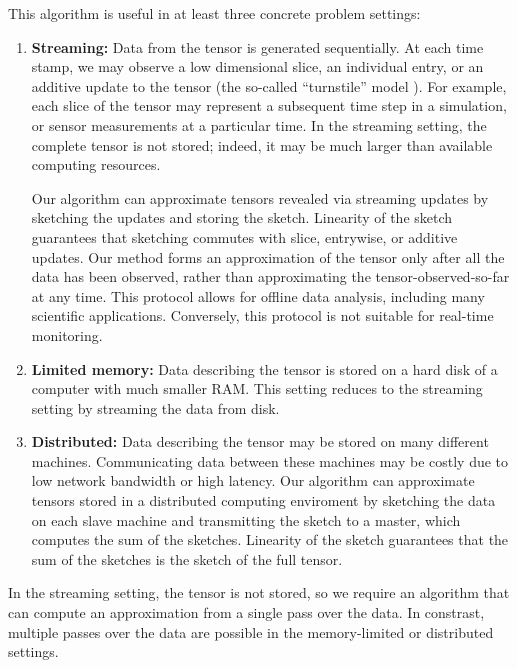 This algorithm is useful in at least three concrete problem settings:
\begin{enumerate}
\item{\bf Streaming:} Data from the tensor is generated sequentially.
At each time stamp, we may observe
a low dimensional slice,
an individual entry,
or an additive update to the tensor
(the so-called ``turnstile'' model \citep{muthukrishnan2005data}).
For example, each slice of the tensor may represent a subsequent
time step in a simulation, or sensor measurements at a particular time.
In the streaming setting,
the complete tensor is not stored; indeed, it may be much larger than
available computing resources.

Our algorithm can approximate tensors revealed via streaming updates
by sketching the updates and storing the sketch.
Linearity of the sketch guarantees that sketching commutes with
slice, entrywise, or additive updates.
Our method forms an approximation of the tensor
only after all the data has been observed,
rather than approximating the tensor-observed-so-far at any time.
This protocol allows for offline data analysis,
including many scientific applications.
Conversely, this protocol is not suitable for real-time monitoring.

\item{\bf Limited memory:} Data describing the tensor is stored on a hard disk
of a computer with much smaller RAM.
This setting reduces to the streaming setting by streaming the data
from disk.
\item {\bf Distributed:} Data describing the tensor may
be stored on many different machines.
Communicating data between these machines may be costly due to low
network bandwidth or high latency.
Our algorithm can approximate tensors stored in a distributed computing enviroment
by sketching the data on each slave machine and transmitting the sketch to a master,
which computes the sum of the sketches.
Linearity of the sketch guarantees that
the sum of the sketches is the sketch of the full tensor.
\end{enumerate}
In the streaming setting, the tensor is not stored, so
we require an algorithm that can compute an approximation from a single pass over the data.
In constrast, multiple passes over the data are possible in
the memory-limited or distributed settings.




